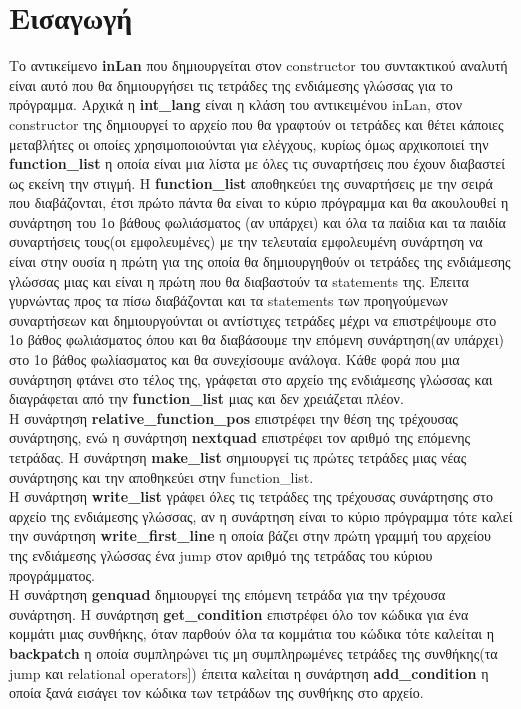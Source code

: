 \documentclass[12pt,a4paper,a4paper]{report}
\begin{document}
\section{Εισαγωγή}
Το αντικείμενο \textbf{inLan} που δημιουργείται στον constructor του συντακτικού αναλυτή είναι αυτό που θα δημιουργήσει τις τετράδες της ενδιάμεσης γλώσσας για το πρόγραμμα. Αρχικά η \textbf{int\_lang} είναι η κλάση του αντικειμένου inLan, στον constructor της δημιουργεί το αρχείο που θα γραφτούν οι τετράδες και θέτει κάποιες μεταβλήτες οι οποίες χρησιμοποιούνται για ελέγχους, κυρίως όμως αρχικοποιεί την \textbf{function\_list} η οποία είναι μια λίστα με όλες τις συναρτήσεις που έχουν διαβαστεί ως εκείνη την στιγμή. Η \textbf{function\_list} αποθηκεύει της συναρτήσεις με την σειρά που διαβάζονται, έτσι πρώτο πάντα θα είναι το κύριο πρόγραμμα και θα ακουλουθεί η συνάρτηση του 1ο βάθους φωλιάσματος (αν υπάρχει) και όλα τα παίδια και τα παιδία συναρτήσεις τους(οι εμφολευμένες) με την τελευταία εμφολευμένη συνάρτηση να είναι στην ουσία η πρώτη για της οποία θα δημιουργηθούν οι τετράδες της ενδιάμεσης γλώσσας μιας και είναι η πρώτη που θα διαβαστούν τα statements της. Έπειτα γυρνώντας προς τα πίσω διαβάζονται και τα statements των προηγούμενων συναρτήσεων και δημιουργούνται οι αντίστιχες τετράδες μέχρι να επιστρέψουμε στο 1ο βάθος φωλιάσματος όπου και θα διαβάσουμε την επόμενη συνάρτηση(αν υπάρχει) στο 1ο βάθος φωλίασματος και θα συνεχίσουμε ανάλογα. Κάθε φορά που μια συνάρτηση φτάνει στο τέλος της, γράφεται στο αρχείο της ενδιάμεσης γλώσσας και διαγράφεται από την \textbf{function\_list} μιας και δεν χρειάζεται πλέον. \\
H συνάρτηση \textbf{relative\_function\_pos} επιστρέφει την θέση της τρέχουσας συνάρτησης, ενώ η συνάρτηση \textbf{nextquad} επιστρέφει τον αριθμό της επόμενης τετράδας. Η συνάρτηση \textbf{make\_list} σημιουργεί τις πρώτες τετράδες μιας νέας συνάρτησης και την αποθηκεύει στην function\_list.\\
H συνάρτηση \textbf{write\_list} γράφει όλες τις τετράδες της τρέχουσας συνάρτησης στο αρχείο της ενδιάμεσης γλώσσας, αν η συνάρτηση είναι το κύριο πρόγραμμα τότε καλεί την συνάρτηση \textbf{write\_first\_line} η οποία βάζει στην πρώτη γραμμή του αρχείου της ενδιάμεσης γλώσσας ένα jump στον αριθμό της τετράδας του κύριου προγράμματος.\\
Η συνάρτηση \textbf{genquad} δημιουργεί της επόμενη τετράδα για την τρέχουσα συνάρτηση. Η συνάρτηση \textbf{get\_condition} επιστρέφει όλο τον κώδικα για ένα κομμάτι μιας συνθήκης, όταν παρθούν όλα τα κομμάτια του κώδικα τότε καλείται η \textbf{backpatch} η οποία συμπληρώνει τις μη συμπληρωμένες τετράδες της συνθήκης(τα jump και relational operators]) έπειτα καλείται η συνάρτηση \textbf{add\_condition} η οποία ξανά εισάγει τον κώδικα των τετράδων της συνθήκης στο αρχείο.\\
\end{document}
